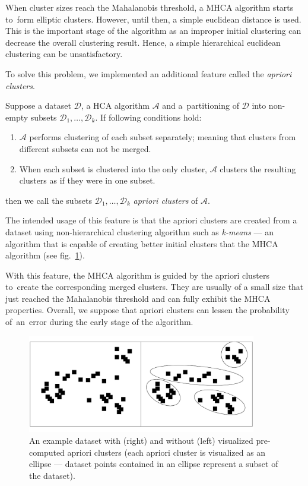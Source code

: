 When cluster sizes reach the Mahalanobis threshold, a MHCA algorithm starts to~form elliptic clusters. However, until then, a simple euclidean distance is used. This is the important stage of the algorithm as an improper initial clustering can decrease the overall clustering result. Hence, a simple hierarchical euclidean clustering can be unsatisfactory.

To solve this problem, we implemented an additional feature called the \emph{apriori clusters}. 

\begin{defn}
	Suppose a dataset $\mathcal{D}$, a HCA algorithm $\mathcal{A}$ and a~partitioning of  $\mathcal{D}$ into non-empty subsets $\mathcal{D}_1,\dots,\mathcal{D}_k$. If following conditions hold:
	\begin{enumerate}
		\item $\mathcal{A}$ performs clustering of each subset separately; meaning that clusters from different subsets can not be merged.
		\item When each subset is clustered into the only cluster, $\mathcal{A}$ clusters the resulting clusters as if they were in one subset.
	\end{enumerate}
	then we call the subsets $\mathcal{D}_1,\dots,\mathcal{D}_k$ \emph{apriori clusters} of $\mathcal{A}$.
	\label{def03:apriori}
\end{defn}

The intended usage of this feature is that the apriori clusters are created from a dataset using non-hierarchical clustering algorithm such as \emph{k-means} --- an algorithm that is capable of creating better initial clusters that the MHCA algorithm (see fig.~\ref{fig03:apr_ex}).

With this feature, the MHCA algorithm is guided by the apriori clusters to~create the corresponding merged clusters. They are usually of a small size that just reached the Mahalanobis threshold and can fully exhibit the MHCA properties. Overall, we suppose that apriori clusters can lessen the probability of~an~error during the early stage of the algorithm.


\begin{figure}\centering
	\includegraphics[width=10cm]{img/apriori_example}
	\caption{An example dataset with (right) and without (left) visualized pre-computed apriori clusters (each apriori cluster is visualized as an ellipse --- dataset points contained in an ellipse represent a subset of the dataset).}
	\label{fig03:apr_ex}
\end{figure}

